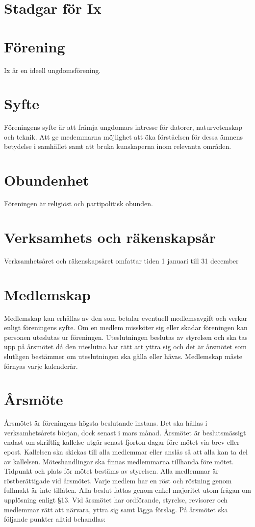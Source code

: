 \documentclass[a4paper,11pt,oneside]{article}
\begin{document}
\section*{Stadgar för Ix}

\section{Förening}
Ix är en ideell ungdomsförening.

\section{Syfte}
Föreningens syfte är att främja ungdomars intresse för datorer, naturvetenskap
och teknik. Att ge medemmarna möjlighet att öka förståelsen för dessa ämnens
betydelse i samhället samt att bruka kunskaperna inom relevanta områden.

\section{Obundenhet}
Föreningen är religiöst och partipolitisk obunden.

\section{Verksamhets­ och räkenskapsår}
Verksamhetsåret och räkenskapsåret omfattar tiden 1 januari till 31 december

\section{Medlemskap}
Medlemskap kan erhållas av den som betalar eventuell medlemsavgift och
verkar enligt föreningens syfte. Om en medlem missköter sig eller skadar
föreningen kan personen uteslutas ur föreningen. Uteslutningen beslutas
av styrelsen och ska tas upp på årsmötet då den uteslutna har rätt att
yttra sig och det är årsmötet som slutligen bestämmer om uteslutningen
ska gälla eller hävas. Medlemskap måste förnyas varje kalenderår.

\section{Årsmöte}
Årsmötet är föreningens högsta beslutande instans. Det ska hållas i
verksamhetsårets början, dock senast i mars månad. Årsmötet är beslutsmässigt
endast om skriftlig kallelse utgår senast fjorton dagar före mötet via brev
eller epost. Kallelsen ska skickas till alla medlemmar eller anslås så att alla
kan ta del av kallelsen. Möteshandlingar ska finnas medlemmarna tillhanda före
mötet. Tidpunkt och plats för mötet bestäms av styrelsen. Alla medlemmar är
röstberättigade vid årsmötet. Varje medlem har en röst och röstning genom
fullmakt är inte tillåten. Alla beslut fattas genom enkel majoritet utom frågan
om upplösning enligt §13. Vid årsmötet har ordförande, styrelse, revisorer och
medlemmar rätt att närvara, yttra sig samt lägga förslag. På årsmötet ska
följande punkter alltid behandlas:
\end{document}
